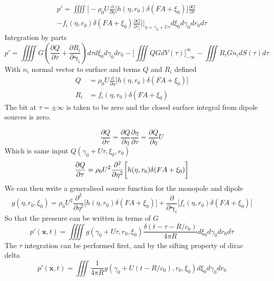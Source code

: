\documentclass[8pt]{article}
\begin{document}
\begin{equation}
    \begin{aligned}
        p' = \iiiint \Bigg[ -\rho_0 U \frac{\partial }{\partial \eta} 
        \bigg[ h(\eta, r_0) \delta(FA + \xi_0) \bigg] 
        \frac{\partial G}{\partial \tau} \\
        - f_i(\eta, r_0) \delta(FA + \xi_0)\frac{\partial G}{\partial \gamma_i}
        \Bigg] \Bigg|_{\eta = \gamma_0 + U\tau} d\xi_0 d\gamma_0 dr_0 d\tau
    \end{aligned}
\end{equation}
Integration by parts
\begin{equation}
    p' = \iiiint G \left(\frac{\partial Q}{\partial \tau} + \frac{\partial R_i}{\partial \boldsymbol{\gamma}_i} \right) d\tau d\xi_0 d\gamma_0 dr_0 - \Bigg[ \iiint  QG  dV(\tau) \Bigg]_{-\infty}^{\infty} - \iiint R_i G n_i dS(\tau) d\tau
\end{equation}
With $n_i$ normal vector to surface and terms $Q$ and $R_i$ defined 
\begin{align}
    Q &= \rho_0 U \frac{\partial }{\partial \eta} \bigg[ h(\eta, r_0) \delta(FA + \xi_0) \bigg] \\
    R_i &= f_i(\eta, r_0) \delta(FA + \xi_0)
\end{align}
The bit at $\tau = \pm \infty$ is taken to be zero and the closed surface integral from dipole sources is zero.

\begin{equation}
    \frac{\partial Q}{\partial \tau} = \frac{\partial Q}{\partial \eta} \frac{\partial \eta}{\partial \tau} = \frac{\partial Q}{\partial \eta} U
\end{equation}
Which is same input $Q(\gamma_0 + U\tau, \xi_0, r_0)$
\begin{equation}
    \frac{\partial Q}{\partial \tau} = \rho_0 U^2 \frac{\partial^2 }{\partial \eta^2} \bigg[ h(\eta, r_0) \delta(FA + \xi_0) \bigg] \\
\end{equation}
We can then write a generalised source function for the monopole and dipole
\begin{equation}
    g(\eta, r_0, \xi_0) = \rho_0 U^2 \frac{\partial^2 }{\partial \eta^2} \bigg[ h(\eta, r_0) \delta(FA + \xi_0) \bigg] + \frac{\partial }{\partial \boldsymbol{\gamma}_i} \Big[ f_i(\eta, r_0) \delta(FA + \xi_0) \Big]
    \label{eq:generalised_source}
\end{equation}
So that the pressure can be written in terms of $G$
\begin{equation}
    p'(\mathbf{x},t) = \iiiint g(\gamma_0 + U\tau, r_0, \xi_0) \frac{\delta(t-\tau-R/c_0)}{4\pi R}d\xi_0 d\gamma_0 dr_0 d\tau
\end{equation}
The $\tau$ integration can be performed first, and by the sifting property of dirac delta
\begin{equation}
    p'(\mathbf{x},t) = \iiint  \frac{1}{4\pi R} g(\gamma_0 + U(t-R/c_0), r_0, \xi_0)d\xi_0 d\gamma_0 dr_0
    \label{eq:sifted_progress}
\end{equation}
\end{document}
